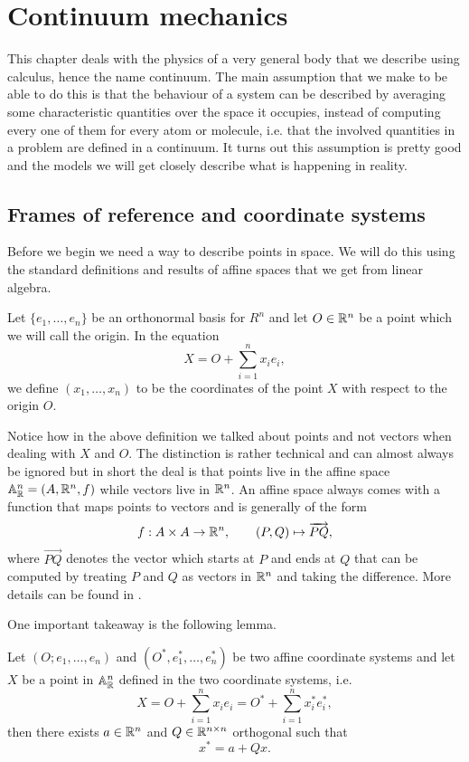 \chapter{Continuum mechanics}

This chapter deals with the physics of a very general body that we describe
using calculus, hence the name continuum. The main assumption that we make to
be able to do this is that the behaviour of a system can be described by
averaging some characteristic quantities over the space it occupies, instead of
computing every one of them for every atom or molecule, i.e. that the involved
quantities in a problem are defined in a continuum. It turns out this
assumption is pretty good and the models we will get closely describe what is
happening in reality.

\section{Frames of reference and coordinate systems}

Before we begin we need a way to describe points in space. We will do this
using the standard definitions and results of affine spaces that we get from
linear algebra.

\begin{dfn}
  Let $\{e_1, \dots, e_n\}$ be an orthonormal basis for $R^n$ and let $O \in
  \mathbb{R}^n$ be a point which we will call the origin. In the equation
  \[
    X = O + \sum_{i = 1}^n x_i e_i,
  \]
  we define $(x_1, \dots, x_n)$ to be the coordinates of the point $X$ with
  respect to the origin $O$.
\end{dfn}

Notice how in the above definition we talked about points and not vectors when
dealing with $X$ and $O$. The distinction is rather technical and can almost
always be ignored but in short the deal is that points live in the affine space
$\mathbb{A}^n_{\mathbb{R}} = (A, \mathbb{R}^n, f)$ while vectors live in $\mathbb{R}^n$. An affine space
always comes with a function that maps points to vectors and is generally of
the form
\[
  f : A \times A \to \mathbb{R}^n,\qquad (P, Q) \mapsto \overrightarrow{PQ},
\]
where $\overrightarrow{PQ}$ denotes the vector which starts at $P$ and ends at
$Q$ that can be computed by treating $P$ and $Q$ as vectors in $\mathbb{R}^n$ and
taking the difference. More details can be found in \cite{wikiaffine}.


One important takeaway is the following lemma.

\begin{lem}
  Let $(O; e_1, \dots, e_n)$ and $(O^*, e_1^*, \dots, e_n^*)$ be two affine
  coordinate systems and let $X$ be a point in $\mathbb{A}^n_{\mathbb{R}}$ defined in the
  two coordinate systems, i.e.
  \[
    X = O + \sum_{i = 1}^n x_i e_i = O^* + \sum_{i = 1}^n x_i^* e_i^*,
  \]
  then there exists $a \in \mathbb{R}^n$ and $Q \in \mathbb{R}^{n\times n}$ orthogonal such that
  \[
    x^* = a  + Q x.
  \]
\end{lem}


